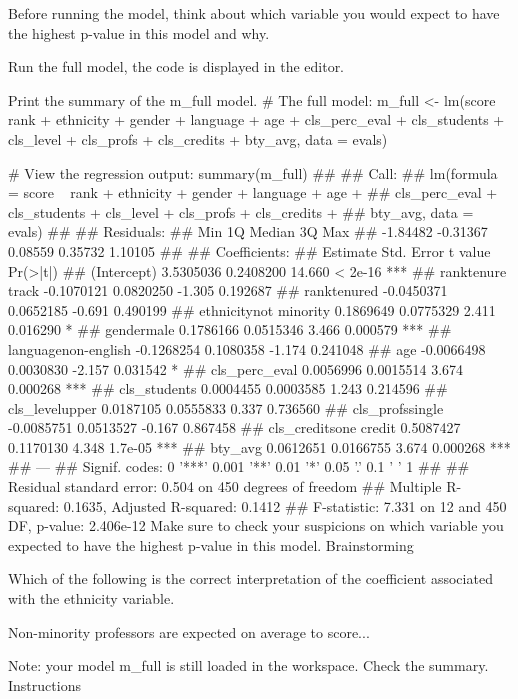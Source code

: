 Before running the model, think about which variable you would expect to have the highest
p-value in this model and why.

Run the full model, the code is displayed in the editor.

Print the summary of the m_full model.
# The full model:
m_full <- lm(score ~ rank + ethnicity + gender + language + age + cls_perc_eval + cls_students + cls_level + cls_profs + cls_credits + bty_avg, data = evals)

# View the regression output:
summary(m_full)
## 
## Call:
## lm(formula = score ~ rank + ethnicity + gender + language + age + 
##     cls_perc_eval + cls_students + cls_level + cls_profs + cls_credits + 
##     bty_avg, data = evals)
## 
## Residuals:
##      Min       1Q   Median       3Q      Max 
## -1.84482 -0.31367  0.08559  0.35732  1.10105 
## 
## Coefficients:
##                         Estimate Std. Error t value Pr(>|t|)    
## (Intercept)            3.5305036  0.2408200  14.660  < 2e-16 ***
## ranktenure track      -0.1070121  0.0820250  -1.305 0.192687    
## ranktenured           -0.0450371  0.0652185  -0.691 0.490199    
## ethnicitynot minority  0.1869649  0.0775329   2.411 0.016290 *  
## gendermale             0.1786166  0.0515346   3.466 0.000579 ***
## languagenon-english   -0.1268254  0.1080358  -1.174 0.241048    
## age                   -0.0066498  0.0030830  -2.157 0.031542 *  
## cls_perc_eval          0.0056996  0.0015514   3.674 0.000268 ***
## cls_students           0.0004455  0.0003585   1.243 0.214596    
## cls_levelupper         0.0187105  0.0555833   0.337 0.736560    
## cls_profssingle       -0.0085751  0.0513527  -0.167 0.867458    
## cls_creditsone credit  0.5087427  0.1170130   4.348  1.7e-05 ***
## bty_avg                0.0612651  0.0166755   3.674 0.000268 ***
## ---
## Signif. codes:  0 '***' 0.001 '**' 0.01 '*' 0.05 '.' 0.1 ' ' 1
## 
## Residual standard error: 0.504 on 450 degrees of freedom
## Multiple R-squared:  0.1635, Adjusted R-squared:  0.1412 
## F-statistic: 7.331 on 12 and 450 DF,  p-value: 2.406e-12
Make sure to check your suspicions on which variable you expected to have the highest
p-value in this model.
Brainstorming

Which of the following is the correct interpretation of the coefficient associated 
with the ethnicity variable.

Non-minority professors are expected on average to score...

Note: your model m_full is still loaded in the workspace. Check the summary.
Instructions

